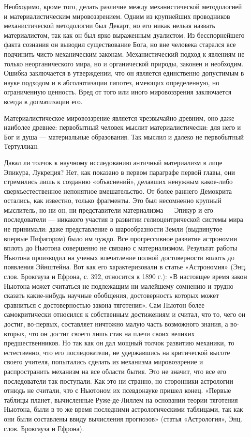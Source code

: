 Необходимо,   кроме  того,   делать  различие   между  механистической
методологией и материалистическим  мировоззрением. Одним из крупнейших
проводников  механистической  методологии  был Декарт,  но  его  никак
нельзя  назвать   материалистом,  так  как  он   был  ярко  выраженным
дуалистом. Из  бесспорнейшего факта сознания он  выводил существование
Бога,  но  вне  человека  старался все  подчинить  чисто  механическим
законам. Механистический  подход к явлениям не  только неорганического
мира,  но   и  органической  природы,  законен   и  необходим.  Ошибка
заключается в  утверждении, что  он является единственно  допустимым в
науке  подходом  и  в  абсолютизации  гипотез,  имеющих  определенную,
но  ограниченную  ценность.  Вред  от  того  или  иного  мировоззрения
заключается всегда в догматизации его.

Материалистическое  мировоззрение  является чрезвычайно  древним,  оно
даже наиболее  древнее: первобытный человек  мыслит материалистически:
для  него и  Бог и  душа ---  материальные образования.  Так мыслил  и
далеко не первобытный Тертуллиан.

Давал ли  толчок к научному  исследованию античный материализм  в лице
Эпикура,  Лукреция?  Нет,  как  показано  в  первом  параграфе  первой
главы, они стремились лишь  к созданию «объяснений», делавших ненужным
какое-либо  сверхъестественное  непонятное   вмешательство.  От  более
раннего Демокрита  остались, как  известно, только фрагменты.  Это был
несомненно крупный мыслитель, но  ни он, ни представители материализма
---  Эпикур  и  его  последователи ---  никакого  участия  в  развитии
гелиоцентрической  системы мира  не  принимали:  даже представление  о
шарообразности Земли (выдвинутое впервые Пифагором) было им чуждо. Все
прогрессивное  развитие астрономии  вплоть  до  Ньютона совершенно  не
связано с материализмом. Результат работы Ньютона производил на ученых
впечатление полной  достоверности вплоть  до появления  Эйнштейна. Вот
как его характеризовали в статье  «Астрономия» (Энц. слов. Брокгауза и
Ефрона, с. 392, относится к 1890 г.): «В настоящее время закон Ньютона
может считаться не  подлежащим ни малейшему сомнению  и трудно сказать
какие-нибудь научные обобщения, достоверность которых может сравниться
с достоверностью  закона тяготения».  Сам Ньютон  более самокритически
относился к собственным достижениям и  считал, что то, чего он достиг,
во-первых,  составляет  ничтожно  малую  часть  возможного  знания,  а
во-вторых,  что он  достиг своего  лишь  став на  плечи своих  великих
предшественников. Но так  как он дал мощный  толчок развитию механики,
то естественно,  что его последователи, не  удержавшись на критической
высоте своего  учителя, попытались сделать из  механизма мировоззрение
и  распространить  механизм  на  все области  бытия.  Это  не  значит,
что  все его  последователи  так  поступали. Как  это  ни странно,  но
сторонники астрологии отнюдь не считали, что с Ньютоном их псевдонауке
пришел конец.  «Первые таблицы  планет, вычисленные  Руже-де-Лиллем на
основании  теории тяготения  Ньютона, были  в то  же время  последними
астрологическими  таблицами,   так  как  они  были   составлены  ввиду
вычисления  прогнозов» (статья  «Астрология», Энц.  слов. Брокгауза  и
Ефрона).

